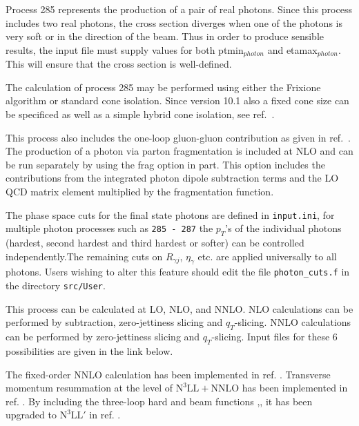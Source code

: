 
\label{subsec:gamgam}
Process 285 represents the production of a pair of real photons. Since     
this process includes two real photons, the cross section diverges when    
one of the photons is very soft or in the direction of the beam. Thus in   
order to produce sensible results, the input file must supply values for  
both ptmin$_{photon}$ and etamax$_{photon}$. This will ensure that the cross   
section is well-defined.

The calculation of process 285 may be performed using either the           
Frixione algorithm or standard cone isolation. Since version 10.1 also a   
fixed cone size can be specificed as well as a simple hybrid cone          
isolation, see ref.~\cite{Neumann:2021zkb}.           

This process also includes the one-loop gluon-gluon contribution as        
given in ref.~\cite{Bern:2002jx}. The 
production of a photon via parton fragmentation is included at NLO and     
can be run separately by using the frag option in part. This option        
includes the contributions from the integrated photon dipole subtraction   
terms and the LO QCD matrix element multiplied by the fragmentation        
function.

The phase space cuts for the final state photons are defined in
{\tt{input.ini}}, for multiple photon processes such as {\tt 285 -
287} the $p_T$'s of the individual photons (hardest, second hardest
and third hardest or softer) can be controlled independently.The
remaining cuts on $R_{\gamma j}$, $\eta_{\gamma}$ etc. are applied
universally to all photons. Users wishing to alter this feature should
edit the file {\tt{photon\_cuts.f}} in the directory {\tt{src/User}}.

This process can be calculated at LO, NLO, and NNLO.
NLO calculations can be performed by subtraction, zero-jettiness slicing and $q_T$-slicing. 
NNLO calculations can be performed by  zero-jettiness slicing and $q_T$-slicing. 
Input files for these 6 possibilities are given in the  link below.

The fixed-order NNLO calculation has been implemented in ref.
\cite{Campbell:2016yrh}. Transverse
momentum resummation at the level of $\text{N}^3\text{LL}+\text{NNLO}$
has been implemented in ref. \cite{Becher:2020ugp}. By including the three-loop hard
\cite{Caola:2020dfu} and beam functions
\cite{Luo:2020epw},\cite{Ebert:2020yqt},\cite{Luo:2019szz} it has been upgraded to $\text{N}^3\text{LL}'$ in ref. \cite{Neumann:2021zkb}.



